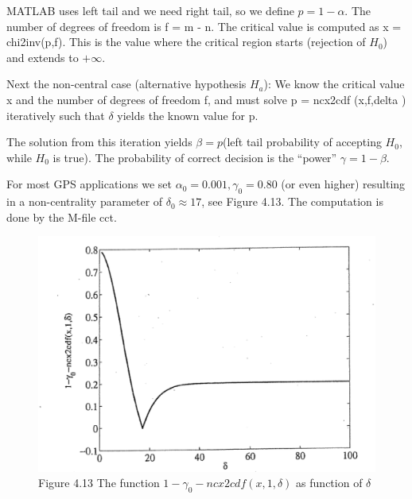 	MATLAB uses left tail and we need right tail, so we define $p=1-\alpha$. The number
	of degrees of freedom is f = m - n. The critical value is computed as x = chi2inv(p,f).
	This is the value where the critical region starts (rejection of $H_0$) and extends to $+\infty$.
	
	Next the non-central case (alternative hypothesis $H_a$): We know the critical value x
	and the number of degrees of freedom f, and must solve p = ncx2cdf (x,f,delta ) iteratively
	such that $\delta$ yields the known value for p.
	
	The solution from this iteration yields $\beta=p$(left tail probability of accepting $H_0$,
	while $H_0$ is true). The probability of correct decision is the “power” $\gamma=1-\beta$.
	
	For most GPS applications we set $\alpha_0=0.001,\gamma_0=0.80$ (or even higher) resulting
	in a non-centrality parameter of $\delta_0\approx 17$, see Figure 4.13. The computation is done by the M-file cct.
	
	\begin{figure}[h]
		\centering
		\includegraphics[width=0.7\linewidth]{TeX_files/Part02/chapter04/image/4-13}
		\caption{Figure 4.13\; The function $1-\gamma_0-ncx2cdf(x,1,\delta)$ as function of $\delta$}
		\label{fig:4-13}
	\end{figure}
	
